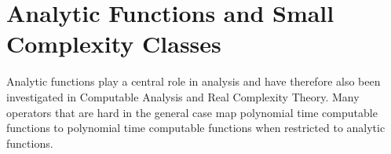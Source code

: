 \documentclass{article}
\begin{document}
\section*{Analytic Functions and Small Complexity Classes}
Analytic functions play a central role in analysis and have therefore also been investigated in Computable Analysis and Real Complexity Theory.
Many operators that are hard in the general case map polynomial time computable functions to polynomial time computable functions when restricted to analytic functions.
{}
\end{document}
